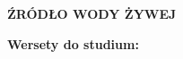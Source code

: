 \documentclass[10pt,a4paper,oneside]{article}
\begin{document}
\centerline{\textbf{\MakeUppercase{Źródło wody żywej}}}
\begin{center}
\textbf{Wersety do studium:} 

\end{center}
\end{document}
